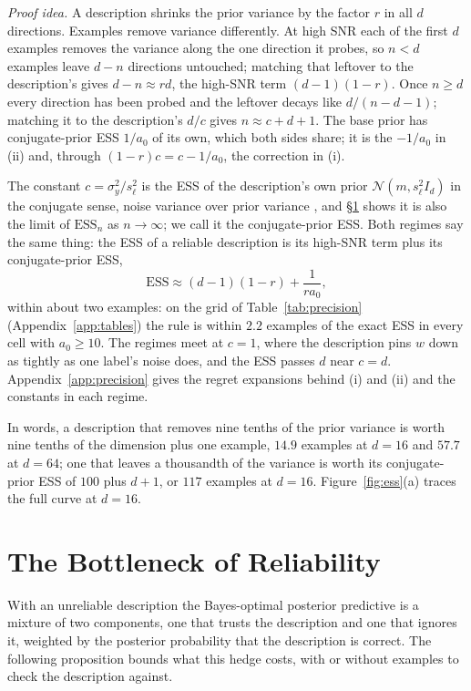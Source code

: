 \documentclass[10pt]{article}
\newcommand{\ess}{\mathrm{ESS}}
\begin{document}
\emph{Proof idea.} A description shrinks the prior variance by the factor $r$ in all $d$ directions. Examples remove variance differently. At high SNR each of the first $d$ examples removes the variance along the one direction it probes, so $n < d$ examples leave $d - n$ directions untouched; matching that leftover to the description's gives $d - n \approx rd$, the high-SNR term $(d-1)(1-r)$. Once $n \ge d$ every direction has been probed and the leftover decays like $d/(n - d - 1)$; matching it to the description's $d/c$ gives $n \approx c + d + 1$. The base prior has conjugate-prior ESS $1/a_0$ of its own, which both sides share; it is the $-1/a_0$ in (ii) and, through $(1-r)c = c - 1/a_0$, the correction in (i).

The constant $c = \sigma_y^2/s_\ell^2$ is the ESS of the description's own prior $\mathcal{N}(m, s_\ell^2 I_d)$ in the conjugate sense, noise variance over prior variance \citep{neuenschwander2020}, and \S\ref{sec:reliability} shows it is also the limit of $\ess_n$ as $n \to \infty$; we call it the conjugate-prior ESS. Both regimes say the same thing: the ESS of a reliable description is its high-SNR term plus its conjugate-prior ESS,
\begin{equation}\label{eq:additive}
\ess \approx (d-1)(1-r) + \frac{1}{r a_0},
\end{equation}
within about two examples: on the grid of Table~\ref{tab:precision} (Appendix~\ref{app:tables}) the rule is within $2.2$ examples of the exact ESS in every cell with $a_0 \ge 10$. The regimes meet at $c = 1$, where the description pins $w$ down as tightly as one label's noise does, and the ESS passes $d$ near $c = d$. Appendix~\ref{app:precision} gives the regret expansions behind (i) and (ii) and the constants in each regime.

In words, a description that removes nine tenths of the prior variance is worth nine tenths of the dimension plus one example, $14.9$ examples at $d = 16$ and $57.7$ at $d = 64$; one that leaves a thousandth of the variance is worth its conjugate-prior ESS of $100$ plus $d + 1$, or $117$ examples at $d = 16$. Figure~\ref{fig:ess}(a) traces the full curve at $d = 16$.

\section{The Bottleneck of Reliability}\label{sec:reliability}

With an unreliable description the Bayes-optimal posterior predictive is a mixture of two components, one that trusts the description and one that ignores it, weighted by the posterior probability that the description is correct. The following proposition bounds what this hedge costs, with or without examples to check the description against.
\end{document}
